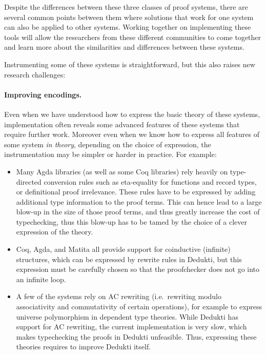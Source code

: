 \bigskip
  
Despite the differences between these three classes of proof systems,
there are several common points between them where solutions that work
for one system can also be applied to other systems. Working together
on implementing these tools will allow the researchers from these
different communities to come together and learn more about the
similarities and differences between these systems.

Instrumenting some of these systems is straightforward, but this also
raises new research challenges:


\paragraph*{Improving encodings.}
Even when we have understood how to express the basic theory of these
systems, implementation often reveals some advanced features of these
systems that require further work.  Moreover even when we know how to
express all features of some system \emph{in theory}, depending on the
choice of expression, the instrumentation may be simpler or harder in
practice. For example:
\begin{itemize}

\item Many Agda libraries (as well as some Coq libraries) rely heavily
  on type-directed conversion rules such as eta-equality for functions
  and record types, or definitional proof irrelevance. These rules
  have to be expressed by adding additional type information to the
  proof terms. This can hence lead to a large blow-up in the size of
  those proof terms, and thus greatly increase the cost of
  typechecking, thus this blow-up has to be tamed by the choice of a
  clever expression of the theory.

\item Coq, Agda, and Matita all provide support for coinductive
  (infinite) structures, which can be expressed by rewrite rules in
  Dedukti, but this expression must be carefully chosen so that the
  proofchecker does not go into an infinite loop.

\item A few of the systems rely on AC rewriting (i.e.~rewriting modulo
  associativity and commutativity of certain operations), for example
  to express universe polymorphism in dependent type theories. While
  Dedukti has support for AC rewriting, the current implementation is
  very slow, which makes typechecking the proofs in Dedukti
  unfeasible. Thus, expressing these theories requires to improve
  Dedukti itself.
\end{itemize}

